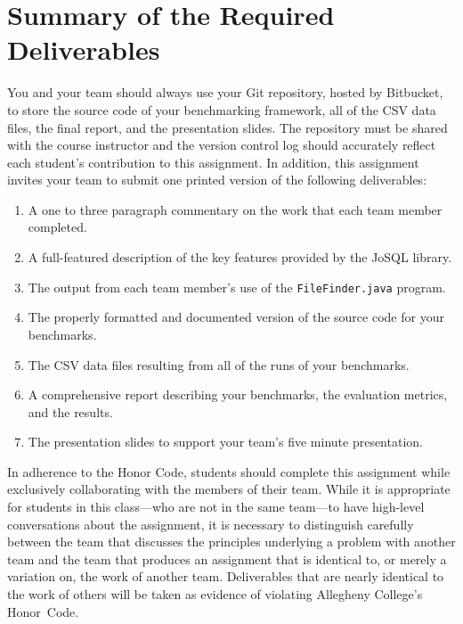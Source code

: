 \section*{Summary of the Required Deliverables}

You and your team should always use your Git repository, hosted by Bitbucket, to store the source code of your
benchmarking framework, all of the CSV data files, the final report, and the presentation slides. The repository must be
shared with the course instructor and the version control log should accurately reflect each student's contribution to
this assignment. In addition, this assignment invites your team to submit one printed version of the following
deliverables:

\vspace*{-.05in}
\begin{enumerate}
    \setlength{\itemsep}{0pt}
  \item A one to three paragraph commentary on the work that each team member completed. 
  \item A full-featured description of the key features provided by the JoSQL library.
  \item The output from each team member's use of the {\tt FileFinder.java} program.
  \item The properly formatted and documented version of the source code for your benchmarks.
  \item The CSV data files resulting from all of the runs of your benchmarks.
  \item A comprehensive report describing your benchmarks, the evaluation metrics, and the results.
    \item The presentation slides to support your team's five minute presentation.
\end{enumerate}

\vspace*{-.1in} 

In adherence to the Honor Code, students should complete this assignment while exclusively collaborating with the
members of their team. While it is appropriate for students in this class---who are not in the same team---to have
high-level conversations about the assignment, it is necessary to distinguish carefully between the team that discusses
the principles underlying a problem with another team and the team that produces an assignment that is identical to, or
merely a variation on, the work of another team.  Deliverables that are nearly identical to the work of others will be
taken as evidence of violating Allegheny College's \mbox{Honor Code}.






